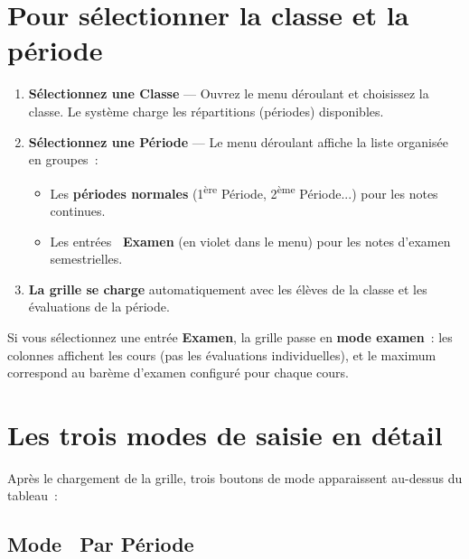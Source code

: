 \section{Pour s\'electionner la classe et la p\'eriode}

\begin{etape}[title=Proc\'edure : Pr\'eparer la grille de saisie]
\begin{enumerate}[leftmargin=1.5cm,label=\textbf{\arabic*.},itemsep=12pt]
  \item \textbf{S\'electionnez une Classe} --- Ouvrez le menu d\'eroulant  et choisissez la classe. Le syst\`eme charge les r\'epartitions (p\'eriodes) disponibles.

  \item \textbf{S\'electionnez une P\'eriode} --- Le menu d\'eroulant  affiche la liste organis\'ee en groupes~:
  \begin{itemize}
    \item Les \textbf{p\'eriodes normales} (1\textsuperscript{\`ere} P\'eriode, 2\textsuperscript{\`eme} P\'eriode...) pour les notes continues.
    \item Les entr\'ees \textbf{\faPencil\ Examen} (en violet dans le menu) pour les notes d'examen semestrielles.
  \end{itemize}

  \item \textbf{La grille se charge} automatiquement avec les \'el\`eves de la classe et les \'evaluations de la p\'eriode.
\end{enumerate}
\end{etape}

\begin{attention}
Si vous s\'electionnez une entr\'ee \textbf{Examen}, la grille passe en \textbf{mode examen}~: les colonnes affichent les cours (pas les \'evaluations individuelles), et le maximum correspond au bar\`eme d'examen configur\'e pour chaque cours.
\end{attention}

\section{Les trois modes de saisie en d\'etail}

Apr\`es le chargement de la grille, trois boutons de mode apparaissent au-dessus du tableau~:

\subsection{Mode \guillemotleft~Par P\'eriode~\guillemotright}

